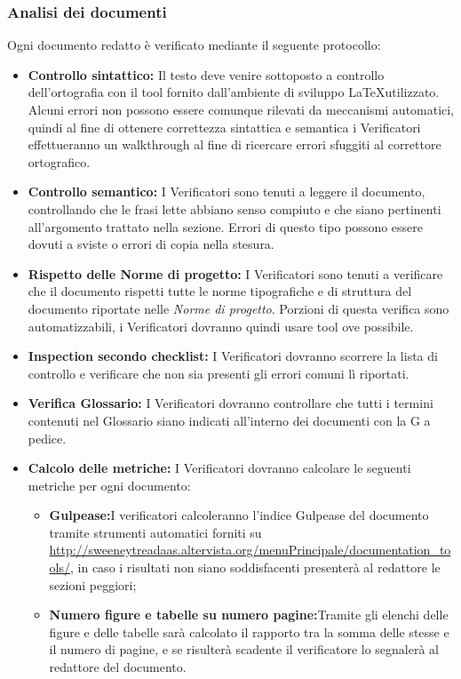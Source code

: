 \documentclass[a4paper]{article}
\begin{document}
			\subsubsection{Analisi dei documenti}
				Ogni documento redatto è verificato mediante il seguente protocollo:
				\begin{itemize}
					\item \textbf{Controllo sintattico:} Il testo deve venire sottoposto a controllo dell'ortografia con il tool
					fornito dall'ambiente di sviluppo \LaTeX utilizzato. Alcuni errori non possono essere comunque rilevati da
					meccanismi automatici, quindi al fine di ottenere correttezza sintattica e semantica i Verificatori
					effettueranno un walkthrough al fine di ricercare errori sfuggiti al correttore ortografico.
					\item \textbf{Controllo semantico:}
		I Verificatori sono tenuti a leggere il documento, controllando che le frasi lette abbiano
		senso compiuto e che siano pertinenti all'argomento trattato nella sezione. Errori di questo
		tipo possono essere dovuti a sviste o errori di copia nella stesura.
					\item \textbf{Rispetto delle Norme di progetto:} I Verificatori sono tenuti a verificare che il documento
					rispetti tutte le norme tipografiche e di struttura del documento riportate nelle \emph{Norme di progetto}. Porzioni
					di questa verifica sono automatizzabili, i Verificatori dovranno quindi usare tool ove possibile. 
					\item \textbf{Inspection secondo checklist:} I Verificatori dovranno scorrere la lista di controllo e
					verificare che non sia presenti gli errori comuni lì riportati.
					\item \textbf{Verifica Glossario:} I Verificatori dovranno controllare che tutti i termini contenuti nel 
					Glossario siano indicati all'interno dei documenti con la G a pedice. 
					\item \textbf{Calcolo delle metriche:} I Verificatori dovranno calcolare le seguenti metriche per ogni documento:
					\begin{itemize}
						\item \textbf{Gulpease:}I verificatori calcoleranno l'indice Gulpease del documento tramite strumenti automatici forniti su \url{http://sweeneytreadaas.altervista.org/menuPrincipale/documentation_tools/}, in caso i risultati non siano soddisfacenti presenterà al redattore le sezioni peggiori;
						\item \textbf{Numero figure e tabelle su numero pagine:}Tramite gli elenchi delle figure e delle tabelle sarà calcolato il rapporto tra la somma delle stesse e il numero di pagine, e se risulterà scadente il verificatore lo segnalerà al redattore del documento.

\end{itemize}
\end{itemize}
\end{document}

